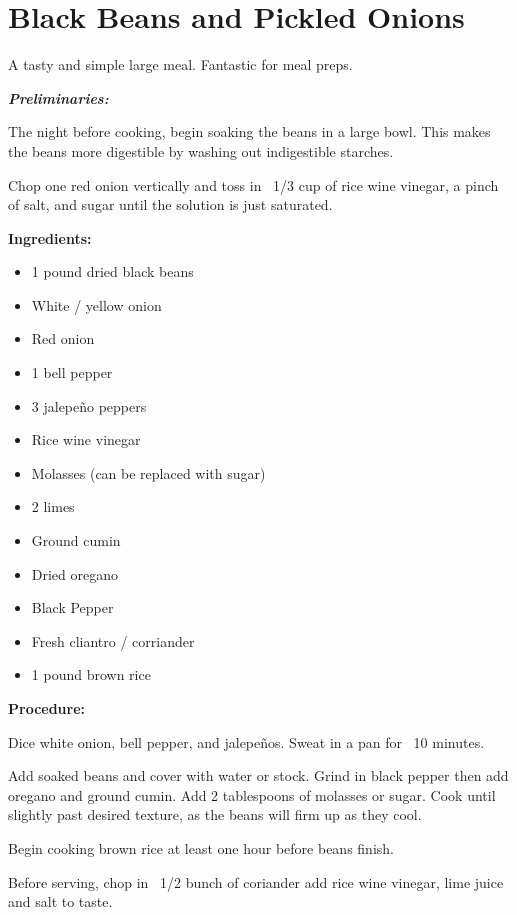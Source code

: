 \section{Black Beans and Pickled Onions} %
A tasty and simple large meal. Fantastic for meal preps.

\textbf{\emph{Preliminaries:}}

The night before cooking, begin soaking the beans in a large bowl. This makes the beans more digestible by washing out indigestible starches.

Chop one red onion vertically and toss in ~1/3 cup of rice wine vinegar, a pinch of salt, and sugar until the solution is just saturated.

\begin{multicols}{2}\raggedcolumns
\textbf{Ingredients:}

\begin{itemize}
	\item 1 pound dried black beans
	\item White / yellow onion
	\item Red onion
	\item 1 bell pepper
	\item 3 jalepeño peppers
	\item Rice wine vinegar
	\item Molasses (can be replaced with sugar)
	\item 2 limes
	\item Ground cumin
	\item Dried oregano
	\item Black Pepper
	\item Fresh cliantro / corriander
	\item 1 pound brown rice
\end{itemize}

\columnbreak

\textbf{Procedure:}

Dice white onion, bell pepper, and jalepeños. Sweat in a pan for ~10 minutes.

Add soaked beans and cover with water or stock. Grind in black pepper then add oregano and ground cumin.
Add 2 tablespoons of molasses or sugar. Cook until slightly past desired texture, as the beans will firm up as they cool.

Begin cooking brown rice at least one hour before beans finish.

Before serving, chop in ~1/2 bunch of coriander add rice wine vinegar, lime juice and salt to taste.

\end{multicols}
